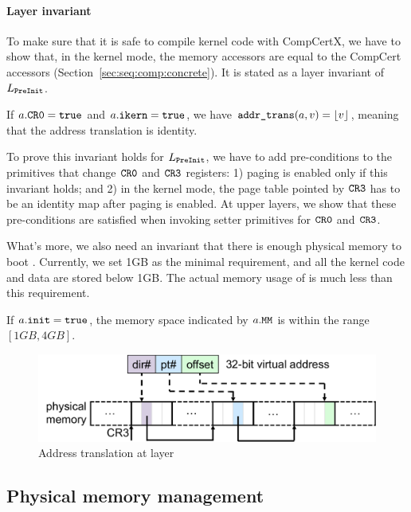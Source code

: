 \paragraph{Layer invariant}
To make sure that it is safe to compile
kernel code with CompCertX,
we have to show that, in the kernel mode,
the memory accessors are equal to the CompCert accessors
(\cf Section~\ref{sec:seq:comp:concrete}).
It is stated as a layer invariant of $L_{\texttt{PreInit}}$.
\begin{invariant}
If $a.{\texttt{CR0}} = {\texttt{true}}$
and $a.{\texttt{ikern}} = {\texttt{true}}$,
we have ${\texttt{addr\_trans}}(a,v) = \left\lfloor {v} \right\rfloor$,
 meaning that the address translation is identity.
\end{invariant}

To prove this invariant holds for $L_{\texttt{PreInit}}$,
we have to add pre-conditions
to the primitives that change ${\texttt{CR0}}$ and ${\texttt{CR3}}$
registers:
1) paging is enabled only if this invariant
holds;
and 2) in the kernel mode,
the page table pointed by ${\texttt{CR3}}$
has to be an identity map
after paging is enabled.
At upper layers,
we  show that
these pre-conditions
are satisfied
when invoking setter primitives for ${\texttt{CR0}}$ and ${\texttt{CR3}}$.

What's more,
we also need an invariant that there is enough
physical memory to boot \mCTOS{}.
Currently, we set 1GB as the minimal requirement,
and all the kernel code and data are stored below
1GB. The actual memory usage of \mCTOS{}
is much less than this requirement.
\begin{invariant}
If $a.{\texttt{init}} = {\texttt{true}}$,
the memory space indicated by $a.{\texttt{MM}}$
is within the range
$[1GB, 4GB]$.
\end{invariant}

\begin{figure}[t]\centering
\includegraphics[scale=.55]{figs/mem_model_1} 
\caption{Address translation at  layer}
\label{fig:seq:mem1}
\hrulefill
\end{figure}




\subsection{Physical memory management}
\label{sec:base:pmm} 

